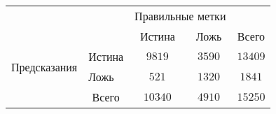 \begin{tabular}{l|l|c|c|c}
\multicolumn{2}{c}{}&\multicolumn{2}{c}{Правильные метки}&\\
\cline{3-4}
\multicolumn{2}{c|}{}&Истина&Ложь&\multicolumn{1}{c}{Всего}\\
\cline{2-4}
\multirow{2}{*}{Предсказания }& Истина & $ 9819 $ & $ 3590 $ & $ 13409$\\
\cline{2-4}
& Ложь & $521$ & $1320$ & $ 1841 $\\
\cline{2-4}
\multicolumn{1}{c}{} & \multicolumn{1}{c}{Всего} & \multicolumn{1}{c}{$10340$} & \multicolumn{1}{c}{$4910$} & \multicolumn{1}{c}{$15250$}\\
\end{tabular}

